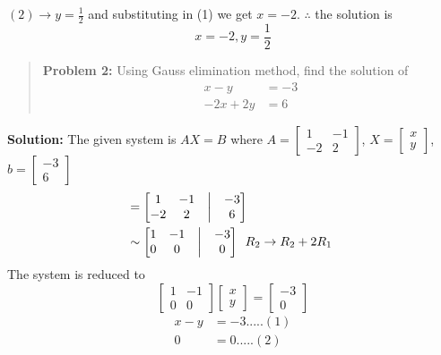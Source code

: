 \documentclass[
  letterpaper,
  DIV=11,
  numbers=noendperiod]{scrreprt}
\begin{document}
\((2)\rightarrow y=\frac{1}{2}\) and substituting in (1) we get
\(x=-2\). \(\therefore\) the solution is \[x=-2,y=\frac{1}{2}\]

\begin{quote}
\textbf{Problem 2:} Using Gauss elimination method, find the solution of
\begin{align*}
x-y &=-3\\
-2x+2y &=6
\end{align*}
\end{quote}

\textbf{Solution:} The given system is \(AX=B\) where
\(A=\begin{bmatrix}
    1 &-1\\
    -2 &2
\end{bmatrix}\), \(X=\begin{bmatrix}
    x\\
    y
\end{bmatrix}\), \(b=\begin{bmatrix}
    -3\\
    6
\end{bmatrix}\) \begin{align*}
    [A|b]&=\begin{bmatrix}
        1 &-1 &\bigm| &-3\\
        -2 &2 &\bigm| &6
    \end{bmatrix}\\
    &\sim \begin{bmatrix}
        1 &-1 &\bigm| &-3\\
        0 &0 &\bigm| &0
    \end{bmatrix}\begin{array}{c}
        R_2\rightarrow R_2+2R_1
    \end{array}
\end{align*} The system is reduced to \[\begin{bmatrix}
    1 &-1\\
    0 &0
\end{bmatrix}\begin{bmatrix}
    x\\
    y
\end{bmatrix}=\begin{bmatrix}
    -3\\
    0
\end{bmatrix}\] \begin{align*}
    x-y &=-3.....(1)\\
    0 &=0.....(2)
\end{align*}
\end{document}
